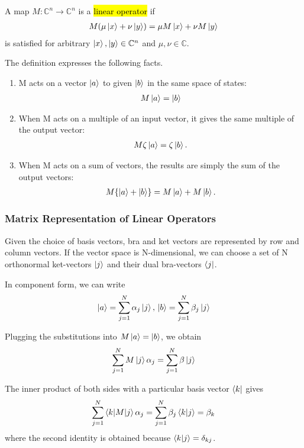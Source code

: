 A map $M: \mathbb{C}^n \rightarrow \mathbb{C}^n$ is a \hl{linear operator} if 
\begin{align*}
    M(\mu\ket{x}+\nu\ket{y})=\mu M\ket{x}+ \nu M\ket{y}
\end{align*}
is satisfied for arbitrary $\ket{x}, \ket{y}\in \mathbb{C}^n$ and $\mu, \nu \in \mathbb{C}$. 

The definition expresses the following facts. 
\begin{enumerate}
    \item M acts on a vector $\ket{a}$ to given $\ket{b}$ in the same space of states:
    \begin{align*}
        M\ket{a}=\ket{b}
    \end{align*}
    \item When M acts on a multiple of an input vector, it gives the same multiple of the output vector:
    \begin{align*}
        M\zeta \ket{a} = \zeta\ket{b}.
    \end{align*}
    \item When M acts on a sum of vectors, the results are simply the sum of the output vectors:
    \begin{align*}
        M\{\ket{a} + \ket{b}\} = M\ket{a} + M\ket{b}.
    \end{align*}
\end{enumerate}

\subsubsection[Matrix Representation]{Matrix Representation of Linear Operators}

Given the choice of basis vectors, bra and ket vectors are represented by row and column vectors. If the vector space is N-dimensional, we can choose a set of N orthonormal ket-vectors $\ket{j}$ and their dual bra-vectors $\bra{j}$. 

In component form, we can write
\begin{align*}
    \ket{a}=\sum_{j=1}^N \alpha_j\ket{j}, \, \ket{b}=\sum_{j=1}^N \beta_j \ket{j}
\end{align*}

Plugging the substitutions into $M\ket{a} = \ket{b}$, we obtain
\begin{align*}
    \sum_{j=1}^N M\ket{j}\alpha_j=\sum_{j=1}^N\beta\ket{j}
\end{align*}

The inner product of both sides with a particular basis vector $\bra{k}$ gives
\begin{align*}
    \sum_{j=1}^N \braket{k|M|j}\alpha_j=\sum_{j=1}^N\beta_j \braket{k|j}=\beta_k
\end{align*}
where the second identity is obtained because $\braket{k|j}=\delta_{kj}$. 

